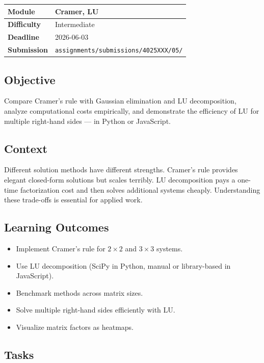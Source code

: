\documentclass[a4paper,11pt]{article}
\newcommand{\assignmentmeta}[4]{%
  \noindent
  \begin{tabularx}{\textwidth}{
    >{\bfseries\color{ippblue}\cellcolor{lightblue}}p{3cm}
    X}
    \arrayrulecolor{gray!40}\hline
    Module     & #1 \\ \hline
    Difficulty & #2 \\ \hline
    Deadline   & #3 \\ \hline
    Submission & \texttt{assignments/submissions/4025XXX/#4/} \\ \hline
  \end{tabularx}
  \vspace{0.8em}
}
\begin{document}
\assignmentmeta{Cramer, LU}{Intermediate}{2026-06-03}{05}

\subsection{Objective}

Compare Cramer's rule with Gaussian elimination and LU decomposition, analyze computational costs empirically, and demonstrate the efficiency of LU for multiple right-hand sides --- in Python or JavaScript.

\subsection{Context}

Different solution methods have different strengths. Cramer's rule provides elegant closed-form solutions but scales terribly. LU decomposition pays a one-time factorization cost and then solves additional systems cheaply. Understanding these trade-offs is essential for applied work.

\subsection{Learning Outcomes}

\begin{itemize}[leftmargin=*]
  \item Implement Cramer's rule for $2 \times 2$ and $3 \times 3$ systems.
  \item Use LU decomposition (SciPy in Python, manual or library-based in JavaScript).
  \item Benchmark methods across matrix sizes.
  \item Solve multiple right-hand sides efficiently with LU.
  \item Visualize matrix factors as heatmaps.
\end{itemize}

\subsection{Tasks}
\end{document}

